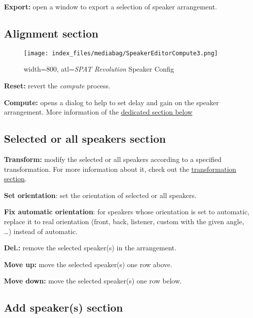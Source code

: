 \documentclass[
  letterpaper,
  DIV=11,
  numbers=noendperiod]{scrreport}
\begin{document}
\textbf{Export:} open a window to export a selection of speaker
arrangement.

\hypertarget{alignment-section}{%
\subsection{Alignment section}\label{alignment-section}}

\begin{figure}

{\centering \texttt{[image: index\_files/mediabag/SpeakerEditorCompute3.png]}

}

\caption{width=800, atl=\emph{SPAT Revolution} Speaker Config}

\end{figure}

\textbf{Reset:} revert the \emph{compute} process.

\textbf{Compute:} opens a dialog to help to set delay and gain on the
speaker arrangement. More information of the
\href{Spat_Environment_Speaker_Arrangement_Editor.md?id=delay-and-gain-computing}{dedicated
section below}

\hypertarget{selected-or-all-speakers-section}{%
\subsection{Selected or all speakers
section}\label{selected-or-all-speakers-section}}

\textbf{Transform:} modify the selected or all speakers according to a
specified transformation. For more information about it, check out the
\href{Spat_Environment_Transformation.md}{transformation section}.

\textbf{Set orientation}: set the orientation of selected or all
speakers.

\textbf{Fix automatic orientation}: for speakers whose orientation is
set to automatic, replace it to real orientation (front, back, listener,
custom with the given angle, \ldots) instead of automatic.

\textbf{Del.:} remove the selected speaker(s) in the arrangement.

\textbf{Move up:} move the selected speaker(s) one row above.

\textbf{Move down:} move the selected speaker(s) one row below.

\hypertarget{add-speakers-section}{%
\subsection{Add speaker(s) section}\label{add-speakers-section}}
\end{document}
